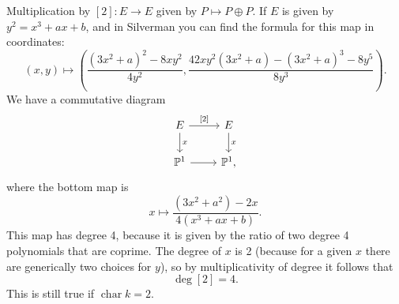 \begin{example}
  Multiplication by \( [2] \colon E \to E \) given by \( P\mapsto P \oplus P \).
  If \( E \) is given by \( y^2=x^3+ax+b \), and in Silverman you can find the formula for this map in coordinates:
  \[ \left( x,y \right) \mapsto \left( \frac{(3x^2+a)^2 - 8xy^2}{4y^2}, \frac{42xy^2 \left( 3x^2 +a \right) - (3x^2 +a)^3 - 8y^5}{8y^3} \right) . \]
  We have a commutative diagram
  \[
  \begin{tikzcd}
    E \arrow[r,"{[2]}"] \arrow[d,"x"] & E \arrow[d,"x"] \\
    \mathbb{P}^1 \arrow[r] & \mathbb{P}^1 ,
  \end{tikzcd}
\]
where the bottom map is
\[ x \mapsto \frac{(3x^2 + a^2)-2x}{4(x^3+ax+b)} . \]
This map has degree 4, because it is given by the ratio of two degree 4 polynomials that are coprime.
The degree of \( x \) is 2 (because for a given \( x \) there are generically two choices for \( y \)), so by multiplicativity of degree it follows that \[ \operatorname{deg}[2] = 4 . \]
This is still true if \( \operatorname{char}k = 2 \).
\end{example}

